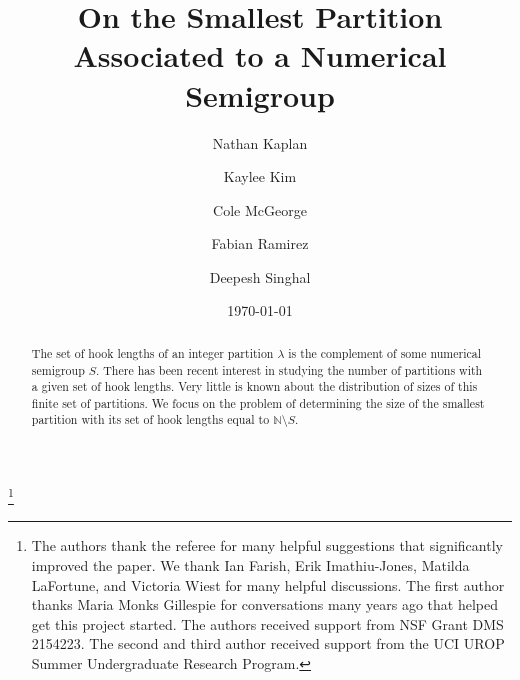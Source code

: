 \documentclass{amsproc}
\newcommand{\N}{\mathbb{N}}
\theoremstyle{definition}
\theoremstyle{remark}
\numberwithin{equation}{section}
\begin{document}
\title{On the Smallest Partition Associated to a Numerical Semigroup}

\author[N. Kaplan]{Nathan Kaplan}
\address{Department of Mathematics, University of California, Irvine, 340 Rowland Hall, Irvine, CA 92697-3875}

\thanks{The authors thank the referee for many helpful suggestions that significantly improved the paper.  We thank Ian Farish, Erik Imathiu-Jones, Matilda LaFortune, and Victoria Wiest for many helpful discussions. The first author thanks Maria Monks Gillespie for conversations many years ago that helped get this project started. The authors received support from NSF Grant DMS 2154223. The second and third author received support from the UCI UROP Summer Undergraduate Research Program.}

\author[K. Kim]{Kaylee Kim}
\address{Department of Mathematics, University of California, Irvine, 340 Rowland Hall, Irvine, CA 92697-3875}

\author[C. McGeorge]{Cole McGeorge}
\address{Department of Mathematics, University of California, Irvine, 340 Rowland Hall, Irvine, CA 92697-3875}

\author[F. Ramirez]{Fabian Ramirez}
\address{Department of Mathematics, University of California, Irvine, 340 Rowland Hall, Irvine, CA 92697-3875}


\author[D. Singhal]{Deepesh Singhal}
\address{Department of Mathematics, University of California, Irvine, 340 Rowland Hall, Irvine, CA 92697-3875}




\date{\today}

\begin{abstract}
The set of hook lengths of an integer partition $\lambda$ is the complement of some numerical semigroup $S$.  There has been recent interest in studying the number of partitions with a given set of hook lengths.  Very little is known about the distribution of sizes of this finite set of partitions.  We focus on the problem of determining the size of the smallest partition with its set of hook lengths equal to $\N\setminus S$.
\end{abstract}

\maketitle
\end{document}
